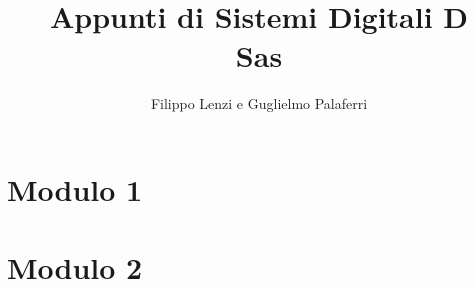\documentclass[a4paper,oneside]{book}
\begin{document}
    \title{
        Appunti di Sistemi Digitali D \\
        \normalsize Sas
        }
	\author{Filippo Lenzi e Guglielmo Palaferri}

    \maketitle

	\tableofcontents
    \thispagestyle{empty}

    \chapter{Modulo 1}
    
    \chapter{Modulo 2}
    
\end{document}
